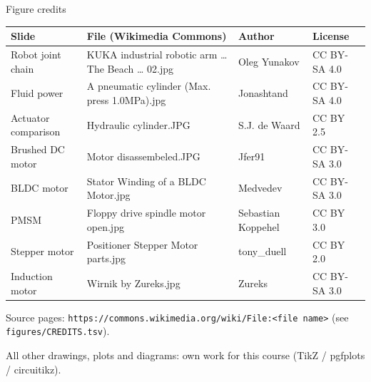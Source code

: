 \documentclass[aspectratio=169,10pt]{beamer}
\begin{document}
\begin{frame}{Figure credits}
\scriptsize
\renewcommand{\arraystretch}{1.1}
\begin{tabularx}{\textwidth}{@{}l l X l@{}}
\toprule
\textbf{Slide} & \textbf{File (Wikimedia Commons)} & \textbf{Author} & \textbf{License}\\
\midrule
Robot joint chain & KUKA industrial robotic arm \dots{} The Beach \dots{} 02.jpg & Oleg Yunakov & CC BY-SA 4.0\\
Fluid power & A pneumatic cylinder (Max. press 1.0MPa).jpg & Jonashtand & CC BY-SA 4.0\\
Actuator comparison & Hydraulic cylinder.JPG & S.J. de Waard & CC BY 2.5\\
Brushed DC motor & Motor disassembeled.JPG & Jfer91 & CC BY-SA 3.0\\
BLDC motor & Stator Winding of a BLDC Motor.jpg & Medvedev & CC BY-SA 3.0\\
PMSM & Floppy drive spindle motor open.jpg & Sebastian Koppehel & CC BY 3.0\\
Stepper motor & Positioner Stepper Motor parts.jpg & tony\_duell & CC BY 2.0\\
Induction motor & Wirnik by Zureks.jpg & Zureks & CC BY-SA 3.0\\
\bottomrule
\end{tabularx}
{\tiny Source pages: \texttt{https://commons.wikimedia.org/wiki/File:<file name>} (see \texttt{figures/CREDITS.tsv}).}
\vspace{2mm}

All other drawings, plots and diagrams: own work for this course (TikZ / pgfplots / circuitikz).
\end{frame}
\end{document}
